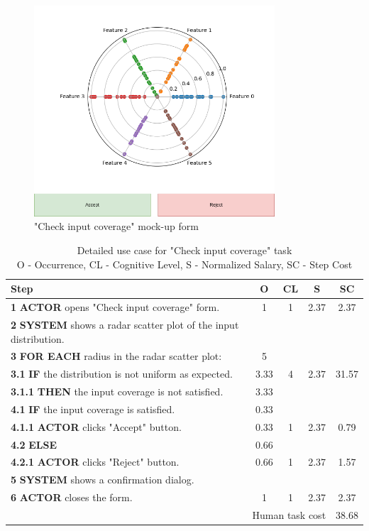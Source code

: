 \begin{figure}[H]
\centering
\includegraphics[width=0.8\textwidth]{figures/check_input_coverage.png}
\caption{"Check input coverage" mock-up form}
\end{figure}

\begin{table}[H]
\centering
\begin{tabularx}{\textwidth}{|X|c|c|c|c|}
\hline
\textbf{Step} & \textbf{O} & \textbf{CL} & \textbf{S} & \textbf{SC} \\
\hline
\textbf{1} \textbf{ACTOR} opens "Check input coverage" form. & 1 & 1 & 2.37 & 2.37 \\
\hline
\textbf{2} \textbf{SYSTEM} shows a radar scatter plot of the input distribution. & & & & \\
\hline
\textbf{3} \textbf{FOR EACH} radius in the radar scatter plot: & 5 & & & \\
\hline
\textbf{3.1} \textbf{IF} the distribution is not uniform as expected. & 3.33 & 4 & 2.37 & 31.57\\
\hline
\textbf{3.1.1} \textbf{THEN} the input coverage is not satisfied. & 3.33 & & & \\
\hline
\textbf{4.1} \textbf{IF} the input coverage is satisfied. & 0.33 & & & \\
\hline
\textbf{4.1.1} \textbf{ACTOR} clicks "Accept" button. & 0.33 & 1 & 2.37 & 0.79\\
\hline
\textbf{4.2} \textbf{ELSE} & 0.66 & & & \\
\hline
\textbf{4.2.1} \textbf{ACTOR} clicks "Reject" button. & 0.66 & 1 & 2.37 & 1.57\\
\hline
\textbf{5} \textbf{SYSTEM} shows a confirmation dialog. & & & & \\
\hline
\textbf{6} \textbf{ACTOR} closes the form. & 1 & 1 & 2.37 & 2.37 \\
\hline
\multicolumn{4}{|r|}{Human task cost} & 38.68\\
\hline
\end{tabularx}
\caption{Detailed use case for "Check input coverage" task\\ 
O - Occurrence, CL - Cognitive Level, S - Normalized Salary, SC - Step Cost}
\label{table:check_input_coverage}
\end{table}

